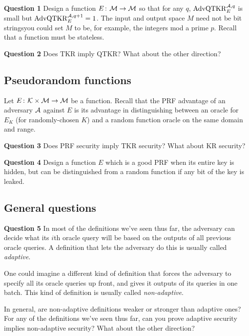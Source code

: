 \documentclass{article}
\newcommand{\KR}{\mathrm{KR}}
\newcommand{\TKR}{\mathrm{TKR}}
\newcommand{\LQKR}{\mathrm{QTKR}}
\newcommand{\AdvLQKR}[2]{\mathrm{AdvQTKR}_{#1}^{#2}}
\newcommand{\keyspace}{\calK}
\begin{document}
\noindent\textbf{Question 1} Design a function 
$E{\kern .05em}\colon{\kern .05em} \mathcal{M}\rightarrow \mathcal{M}$ so that for any $q$, $\AdvLQKR{E}{\advA,q}$ is small but $\AdvLQKR{E}{\advA,q+1}=1$. The input and output space $M$ need not be bit strings\textemdash you could set $M$ to be, for example, the integers mod a prime $p$. Recall that a function must be stateless.

\noindent\textbf{Question 2} Does $\TKR$ imply $\LQKR$? What about the other direction?

\subsection*{Pseudorandom functions}

Let $E\Colon\keyspace\times\msgspace\rightarrow\msgspace$ be a function. Recall that the PRF advantage of an adversary ${\mathcal A}$ against $E$ is its advantage in distinguishing between an oracle for $E_K$ (for randomly-chosen $K$) and a random function oracle on the same domain and range.

\noindent\textbf{Question 3} Does PRF security imply $\TKR$ security? What about $\KR$ security?


\noindent\textbf{Question 4} Design a function $E$ which is a good PRF when its entire key is hidden, but can be distinguished from a random function if any bit of the key is leaked.

\subsection*{General questions}

\noindent\textbf{Question 5} In most of the definitions we've seen thus far, the adversary can decide what its $i$th oracle query will be based on the outputs of all previous oracle queries. A definition that lets the adversary do this is usually called \emph{adaptive}. 

One could imagine a different kind of definition that forces the adversary to specify all its oracle queries up front, and gives it outputs of its queries in one batch. This kind of definition is usually called \emph{non-adaptive}. 

In general, are non-adaptive definitions weaker or stronger than adaptive ones? For any of the definitions we've seen thus far, can you prove adaptive security implies non-adaptive security? What about the other direction?
\end{document}
